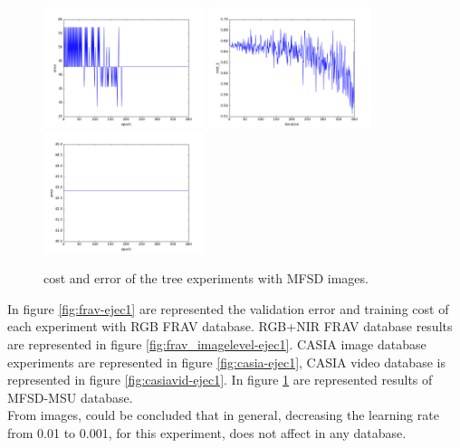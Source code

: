 \begin{figure}[htb]
\includegraphics[width=0.42\textwidth]{images/redes/ejecucion1/general_svm_mfsd/minidataset_tested_itself/error.png}
\includegraphics[width=0.42\textwidth]{images/redes/ejecucion1/general_svm_mfsd/minidataset_tested_iteself_lr_0_001/cost.png}
\includegraphics[width=0.42\textwidth]{images/redes/ejecucion1/general_svm_mfsd/minidataset_tested_iteself_lr_0_001/error.png}
\caption{cost and error of the tree experiments with MFSD images.} \label{fig:mfsd-ejec1}
\end{figure}

In figure \ref{fig:frav-ejec1} are represented the validation error and training cost of each experiment with RGB FRAV database. RGB+NIR FRAV database results are represented in figure \ref{fig:frav_imagelevel-ejec1}. CASIA image database experiments are represented in figure  \ref{fig:casia-ejec1}, CASIA video database is represented in figure \ref{fig:casiavid-ejec1}. In figure \ref{fig:mfsd-ejec1} are represented results of MFSD-MSU database.\\

From images, could be concluded that in general, decreasing the learning rate from 0.01 to 0.001, for this experiment, does not affect in any database.\\

